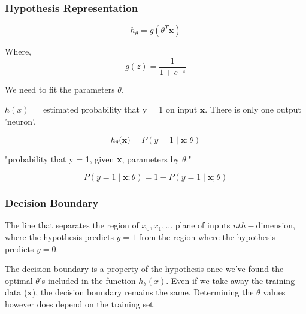 \documentclass{article}
\begin{document}
\subsubsection{Hypothesis Representation}

\begin{equation}
    h_{\theta} = g(\theta^T \textbf{x})
\end{equation}

Where,
\begin{equation}
    g(z) = \frac{1}{1+e^{-z}}
\end{equation}

\begin{center}
\end{center}


We need to fit the parameters $\theta$.

$h(x) =$ estimated probability that y = 1 on input $\textbf{x}$. There is only one output  'neuron'.

\begin{equation}
    h_{\theta} (\textbf{x)} = P(y = 1  \mid \textbf{x}; \theta)
\end{equation}

"probability that y = 1, given \textbf{x}, parameters by $\theta$."


\begin{equation}
    P(y = 1 \mid \textbf{x};\theta) = 1 - P(y=1 \mid \textbf{x}; \theta)
\end{equation}




\subsubsection{Decision Boundary}

The line that separates the region of $x_0, x_1, ...$ plane of inputs $nth-$dimension, where the hypothesis predicts $y=1$ from the region where the hypothesis predicts $y=0$.

The decision boundary is a property of the hypothesis once we've found the optimal $\theta$'s included in the function $h_{\theta} (x)$. Even if we take away the training data ($\textbf{x}$), the decision boundary remains the same. Determining the $\theta$ values however does depend on the training set.
\end{document}
